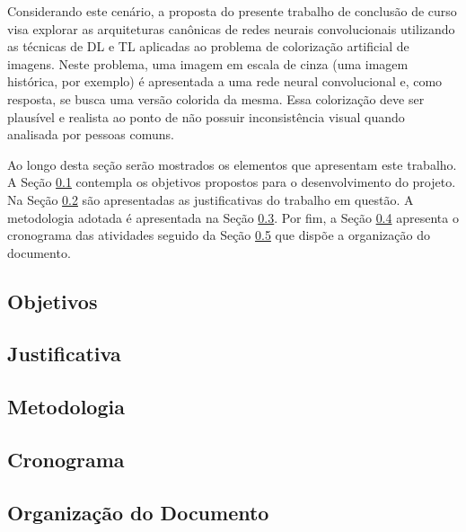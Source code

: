Considerando este cenário, a proposta do presente trabalho de conclusão de curso visa explorar as arquiteturas canônicas de redes neurais convolucionais utilizando as técnicas de DL e TL aplicadas ao problema de colorização artificial de imagens. Neste problema, uma imagem em escala de cinza (uma imagem histórica, por exemplo) é apresentada a uma rede neural convolucional e, como resposta, se busca uma versão colorida da mesma. Essa colorização deve ser plausível e realista ao ponto de não possuir inconsistência visual quando analisada por pessoas comuns.

Ao longo desta seção serão mostrados os elementos que apresentam este trabalho. A Seção \ref{subsec:objetivos} contempla os objetivos propostos para o desenvolvimento do projeto. Na Seção \ref{subsec:jutificativa} são apresentadas as justificativas do trabalho em questão. A metodologia adotada é apresentada na Seção \ref{subsec:metodologia}. Por fim, a Seção \ref{subsec:cronograma} apresenta o cronograma das atividades seguido da Seção \ref{subsec:organizacao} que dispõe a organização do documento. 

\subsection{Objetivos} \label{subsec:objetivos}


\subsection{Justificativa} \label{subsec:jutificativa}


\subsection{Metodologia} \label{subsec:metodologia}


\subsection{Cronograma} \label{subsec:cronograma}


\subsection{Organização do Documento} \label{subsec:organizacao}
